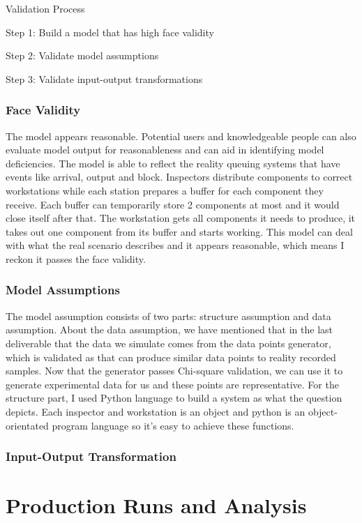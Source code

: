 \documentclass{article}
\begin{document}
Validation Process

Step 1: Build a model that has high face validity

Step 2: Validate model assumptions

Step 3: Validate input-output transformations

\subsubsection{Face Validity}

The model appears reasonable. Potential users and knowledgeable people can also evaluate model output for reasonableness and can aid in identifying model deficiencies. The model is able to reflect the reality queuing systems that have events like arrival, output and block. Inspectors distribute components to correct workstations while each station prepares a buffer for each component they receive. Each buffer can temporarily store 2 components at most and it would close itself after that. The workstation gets all components it needs to produce, it takes out one component from its buffer and starts working. This model can deal with what the real scenario describes and it appears reasonable, which means I reckon it passes the face validity. 


\subsubsection{Model Assumptions}

The model assumption consists of two parts: structure assumption and data assumption. About the data assumption, we have mentioned that in the last deliverable that the data we simulate comes from the data points generator, which is validated as that can produce similar data points to reality recorded samples. Now that the generator passes Chi-square validation, we can use it to generate experimental data for us and these points are representative. For the structure part, I used Python language to build a system as what the question depicts. Each inspector and workstation is an object and python is an object-orientated program language so it's easy to achieve these functions.

\subsubsection{Input-Output Transformation}

\section{Production Runs and Analysis}
\end{document}
